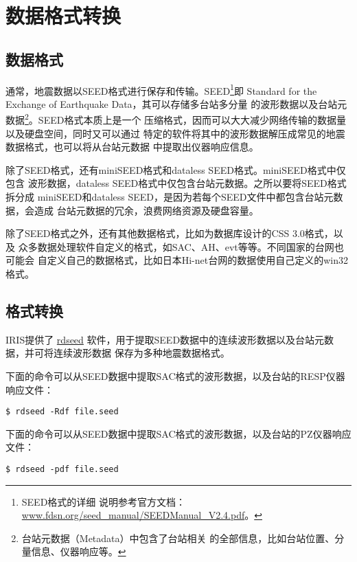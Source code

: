 \section{数据格式转换}
\subsection{数据格式}
通常，地震数据以SEED格式进行保存和传输。SEED\footnote{SEED格式的详细
说明参考官方文档：\url{www.fdsn.org/seed_manual/SEEDManual_V2.4.pdf}。}即
Standard for the Exchange of Earthquake Data，其可以存储多台站多分量
的波形数据以及台站元数据\footnote{台站元数据（Metadata）中包含了台站相关
的全部信息，比如台站位置、分量信息、仪器响应等。}。SEED格式本质上是一个
压缩格式，因而可以大大减少网络传输的数据量以及硬盘空间，同时又可以通过
特定的软件将其中的波形数据解压成常见的地震数据格式，也可以将从台站元数据
中提取出仪器响应信息。

除了SEED格式，还有miniSEED格式和dataless SEED格式。miniSEED格式中仅包含
波形数据，dataless SEED格式中仅包含台站元数据。之所以要将SEED格式拆分成
miniSEED和dataless SEED，是因为若每个SEED文件中都包含台站元数据，会造成
台站元数据的冗余，浪费网络资源及硬盘容量。

除了SEED格式之外，还有其他数据格式，比如为数据库设计的CSS 3.0格式，以及
众多数据处理软件自定义的格式，如SAC、AH、evt等等。不同国家的台网也可能会
自定义自己的数据格式，比如日本Hi-net台网的数据使用自己定义的win32格式。

\subsection{格式转换}
IRIS提供了 \href{http://ds.iris.edu/ds/nodes/dmc/forms/rdseed/}{rdseed}
软件，用于提取SEED数据中的连续波形数据以及台站元数据，并可将连续波形数据
保存为多种地震数据格式。

下面的命令可以从SEED数据中提取SAC格式的波形数据，以及台站的RESP仪器响应文件：
\begin{verbatim}
$ rdseed -Rdf file.seed
\end{verbatim}

下面的命令可以从SEED数据中提取SAC格式的波形数据，以及台站的PZ仪器响应文件：
\begin{verbatim}
$ rdseed -pdf file.seed
\end{verbatim}
